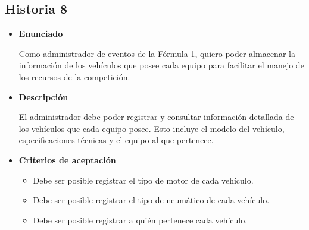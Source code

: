 \documentclass{article}
\begin{document}
	\subsection{Historia 8}
	\begin{itemize}
		
		\item \large{\textbf{Enunciado}}
		\begin{description}
Como administrador de eventos de la Fórmula 1, quiero poder almacenar la información de los vehículos que posee cada equipo para facilitar el manejo de los recursos de la competición.

		\end{description}
		
		\item \large{\textbf{Descripción}}
		\begin{description}
El administrador debe poder registrar y consultar información detallada de los vehículos que cada equipo posee. Esto incluye el modelo del vehículo, especificaciones técnicas y el equipo al que pertenece. 

		\end{description}
		
		\item \large{\textbf{Criterios de aceptación}}
		\begin{itemize}
			\item Debe ser posible registrar el tipo de motor de cada vehículo. 
			\item Debe ser posible registrar el tipo de neumático de cada vehículo. 
			\item Debe ser posible registrar a quién pertenece cada vehículo. 
			
		\end{itemize}
		
	\end{itemize}
	
\end{document}
